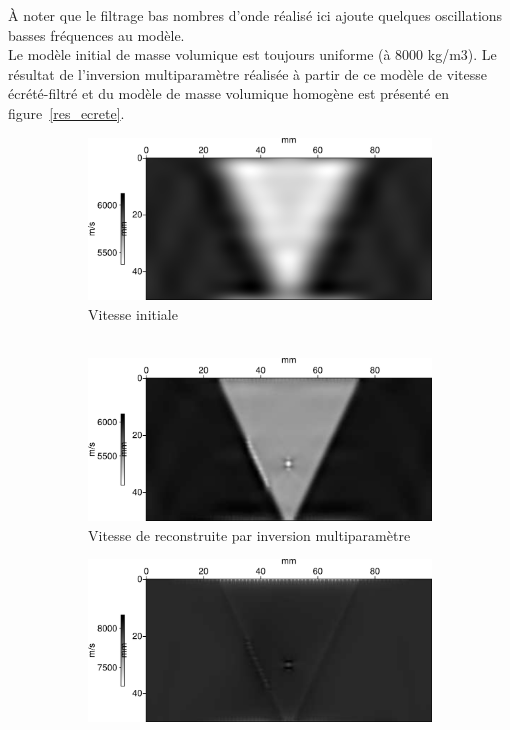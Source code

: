 \documentclass[a4paper,11pt]{report} %
\newenvironment{changemargin}[2]{\begin{list}{}{%
\setlength{\topsep}{0pt}%
\setlength{\leftmargin}{0pt}%
\setlength{\rightmargin}{0pt}%
\setlength{\listparindent}{\parindent}%
\setlength{\itemindent}{\parindent}%
\setlength{\parsep}{0pt plus 1pt}%
\addtolength{\leftmargin}{#1}%
\addtolength{\rightmargin}{#2}%
\setlength{\textwidth}{21cm}
}\item }{\end{list}}
\begin{document}
À noter que le filtrage bas nombres d'onde réalisé ici ajoute quelques oscillations basses fréquences au modèle.\\

Le modèle initial de masse volumique est toujours uniforme (à 8000 kg/m3). Le résultat de l'inversion multiparamètre réalisée à partir de ce modèle de vitesse écrété-filtré et du modèle de masse volumique homogène est présenté  en figure~\ref{res_ecrete}.

\begin{figure}[!h]
\begin{changemargin}{-2cm}{-2cm}
	\centering
    \begin{subfigure}[b]{0.3\textwidth}
    	\includegraphics[width=\textwidth]{img/vp_ecrete_filtre.png}
    	\caption{Vitesse initiale\\~}
    \end{subfigure}
    \begin{subfigure}[b]{0.3\textwidth}
    	\includegraphics[width=\textwidth]{img/vp_multi_InitEcrete.png}
    	\caption{Vitesse de reconstruite par inversion multiparamètre}
    \end{subfigure}
    \begin{subfigure}[b]{0.3\textwidth}
    	\includegraphics[width=\textwidth]{img/rho_multi_InitEcrete.png}

\end{subfigure}
\end{changemargin}
\end{figure}
\end{document}
